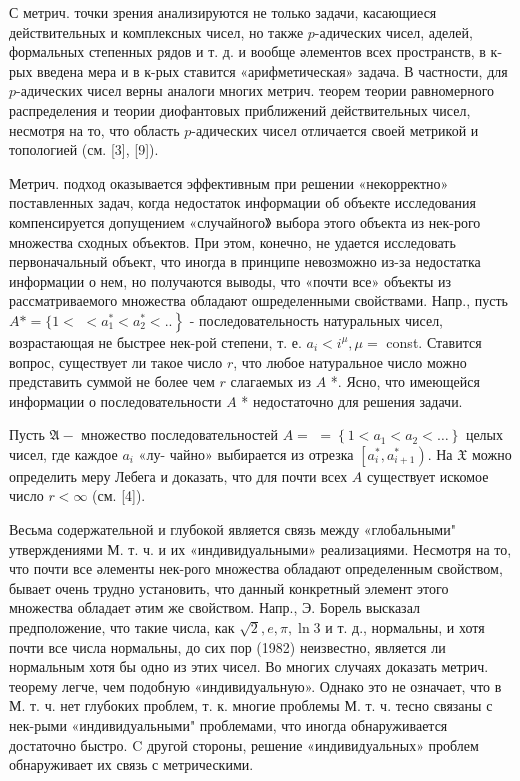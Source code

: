 \documentclass[10pt]{article}
\begin{document}
С метрич. точки зрения анализируются не только задачи, касающиеся действительных и комплексных чисел, но также $p$-адических чисел, аделей, формальных степенных рядов и т. д. и вообще әлементов всех пространств, в к-рых введена мера и в к-рых ставится «арифметическая» задача. В частности, для $p$-адических чисел верны аналоги многих метрич. теорем теории равномерного распределения и теории диофантовых приближений действительных чисел, несмотря на то, что область $p$-адических чисел отличается своей метрикой и топологией (см. [3], [9]).



Метрич. подход оказывается эффективным при решении «некорректно» поставленных задач, когда недостаток информации об объекте исследования компенсируется допущением «случайного》 выбора этого объекта из нек-рого множества сходных объектов. При этом, конечно, не удается исследовать первоначальный объект, что иногда в принципе невозможно из-за недостатка информации о нем, но получаются выводы, что «почти все» объекты из рассматриваемого множества обладают ошределенными свойствами. Напр., пусть $A *=\{1<$ $\left.<a_{1}^{*}<a_{2}^{*}<..\right\}$ - последовательность натуральных чисел, возрастающая не быстрее нек-рой степени, т. е. $a_{i}<i^{\mu}, \mu=$ const. Ставится вопрос, существует ли такое число $r$, что любое натуральное число можно представить суммой не более чем $r$ слагаемых из $A$ *. Ясно, что имеющейся информации о последовательности $A$ * недостаточно для решения задачи.



Пусть $\mathfrak{A}-$ множество последовательностей $A=$ $=\left\{1<a_{1}<a_{2}<\ldots\right\}$ целых чисел, где каждое $a_{i}$ «лу- чайно» выбирается из отрезка $\left[a_{i}^{*}, a_{i+1}^{*}\right)$. На $\mathfrak{X}$ можно определить меру Лебега и доказать, что для почти всех $A$ существует искомое число $r<\infty$ (см. [4]).



Весьма содержательной и глубокой является связь между «глобальными" утверждениями М. т. ч. и их «индивидуальными» реализациями. Несмотря на то, что почти все әлементы нек-рого множества обладают определенным свойством, бывает очень трудно установить, что данный конкретный элемент этого множества обладает әтим же свойством. Напр., Э. Борель высказал предположение, что такие числа, как $\sqrt{2}, e, \pi, \ln 3$ и т. д., нормальны, и хотя почти все числа нормальны, до сих пор (1982) неизвестно, является ли нормальным хотя бы одно из этих чисел. Во многих случаях доказать метрич. теорему легче, чем подобную «индивидуальную». Однако это не означает, что в М. т. ч. нет глубоких проблем, т. к. многие проблемы М. т. ч. тесно связаны с нек-рыми «индивидуальными" проблемами, что иногда обнаруживается достаточно быстро. C другой стороны, решение «индивидуальных» проблем обнаруживает их связь с метрическими.
\end{document}
